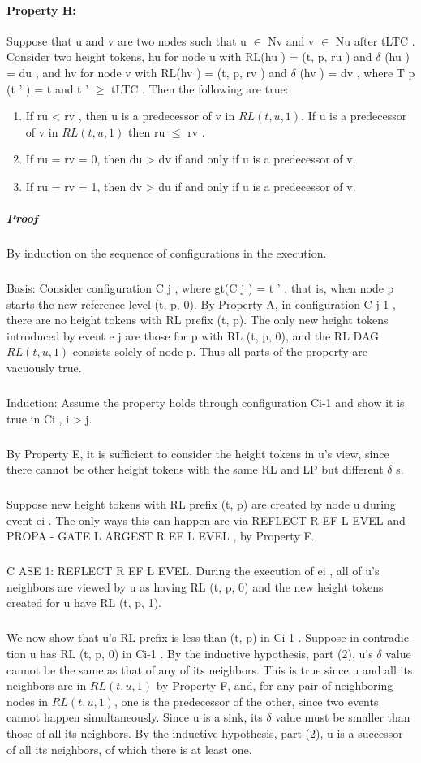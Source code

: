\paragraph{Property H:} Suppose that u and v are two nodes such that u $\in$ Nv and v $\in$ Nu after tLTC . Consider two height tokens, hu for node u with RL(hu ) = (t, p, ru ) and $\delta$ (hu ) = du , and hv for node v with RL(hv ) = (t, p, rv ) and $\delta$ (hv ) = dv , where T p (t ' ) = t and t ' $\geq$ tLTC . Then the following are true:
\begin{enumerate}
	\item If ru < rv , then u is a predecessor of v in $RL (t, u, 1)$. If u is a predecessor of v in $RL (t, u, 1)$ then ru $\leq$ rv .
	\item If ru = rv = 0, then du > dv if and only if u is a predecessor of v.
	\item If ru = rv = 1, then dv > du if and only if u is a predecessor of v.
\end{enumerate}
\subparagraph{Proof} By induction on the sequence of configurations in the execution. 
\subparagraph{}Basis: Consider configuration C j , where gt(C j ) = t ' , that is, when node p starts the new reference level (t, p, 0). By Property A, in configuration C j-1 , there are no height tokens with RL prefix (t, p). The only new height tokens introduced by event e j are those for p with RL (t, p, 0), and the RL DAG $RL (t, u, 1)$ consists solely of node p. Thus all parts of the property are vacuously true.
\subparagraph{}Induction: Assume the property holds through configuration Ci-1 and show it is true in Ci , i > j.
\subparagraph{}By Property E, it is sufficient to consider the height tokens in u's view, since there cannot be other height tokens with the same RL and LP but different $\delta$ s.
\subparagraph{}Suppose new height tokens with RL prefix (t, p) are created by node u during event ei . The only ways this can happen are via REFLECT R EF L EVEL and PROPA - GATE L ARGEST R EF L EVEL , by Property F.
\subparagraph{}C ASE 1: REFLECT R EF L EVEL. During the execution of ei , all of u's neighbors are viewed by u as having RL (t, p, 0) and the new height tokens created for u have RL (t, p, 1).
\subparagraph{}We now show that u's RL prefix is less than (t, p) in Ci-1 . Suppose in contradic- tion u has RL (t, p, 0) in Ci-1 . By the inductive hypothesis, part (2), u's $\delta$ value cannot be the same as that of any of its neighbors. This is true since u and all its neighbors are in $RL (t, u, 1)$ by Property F, and, for any pair of neighboring nodes in $RL (t, u, 1)$, one is the predecessor of the other, since two events cannot happen simultaneously. Since u is a sink, its $\delta$ value must be smaller than those of all its neighbors. By the inductive hypothesis, part (2), u is a successor of all its neighbors, of which there is at least one.
